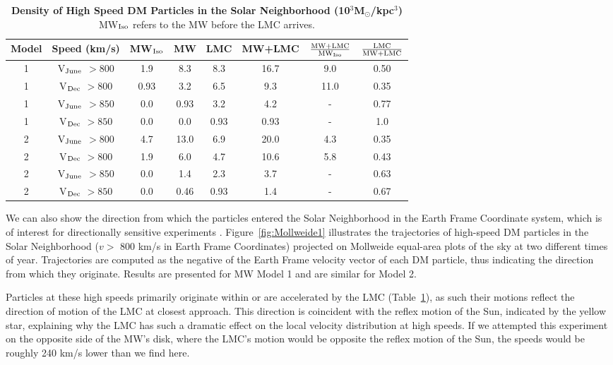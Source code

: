 \documentclass[letterpaper,11pt]{article}
\begin{document}
\begin{table}
\centering
\caption{ {\bf Density of High Speed DM Particles in the Solar Neighborhood (10$^3$M$_\odot$/kpc$^3$)}
\newline
MW$_{\rm Iso}$ refers to the MW before the LMC arrives.}
\label{table:highspeed}
\begin{tabular}{ |c|c|c|c|c|c|c|c| }
\hline\hline
Model & Speed (km/s) &  MW$_{\rm Iso}$ & MW & LMC  & MW+LMC & $\frac{\rm{MW+LMC}}{\rm{MW}_{\rm Iso}}$ & $\frac{{\rm LMC}}{{\rm MW+LMC}}$\\
\hline
1  & V$_{\rm June}$ $>800$  & 1.9  & 8.3 & 8.3 & 16.7 & 9.0 &  0.50\\
1  & V$_{\rm Dec}$ $>800$   & 0.93  & 3.2 & 6.5 & 9.3 & 11.0  & 0.35 \\
\hline
1  & V$_{\rm June}$ $>850$   & 0.0  & 0.93 & 3.2 & 4.2 & - & 0.77  \\
1  & V$_{\rm Dec}$ $>850$   & 0.0  & 0.0 & 0.93 & 0.93 & - &  1.0 \\
\hline
2  & V$_{\rm June}$ $>800$  & 4.7 & 13.0 & 6.9 & 20.0 & 4.3 & 0.35\\  
2  & V$_{\rm Dec}$ $>800$   & 1.9 & 6.0 & 4.7 & 10.6 & 5.8 & 0.43\\
\hline
2  & V$_{\rm June}$ $>850$  & 0.0 & 1.4 & 2.3 & 3.7 & - & 0.63 \\ 
2  & V$_{\rm Dec}$ $>850$   & 0.0 & 0.46 & 0.93 & 1.4 & - & 0.67 \\ 

\hline\hline
\end{tabular}
\end{table}



We can also show the direction from which the particles entered the Solar Neighborhood in the Earth Frame Coordinate system, which is of interest for directionally sensitive experiments \cite{Mayet:2016zxu}.  Figure~\ref{fig:Mollweide1} illustrates the trajectories of 
high-speed DM particles in the Solar Neighborhood  ($v >$ 800 km/s in Earth Frame Coordinates) projected on Mollweide equal-area plots of the sky at two different times of year.  Trajectories are computed 
as the negative of the Earth Frame velocity vector of each DM particle, thus indicating the direction from which they originate. 
Results are presented for MW Model 1 and are similar for Model 2.


 Particles at these high speeds 
 primarily originate within or are accelerated by the LMC (Table~\ref{table:highspeed}), as such their motions reflect 
 the direction of motion of the LMC at closest approach. This direction is coincident with the reflex motion of the Sun, indicated by the yellow star, explaining why the  
LMC has such a dramatic effect on the local velocity distribution at high speeds. If we attempted this 
experiment on the opposite side of the MW's disk, where the LMC's motion would be opposite the reflex motion 
of the Sun, the speeds would be roughly 240 km/s lower than we find here.  
\end{document}
